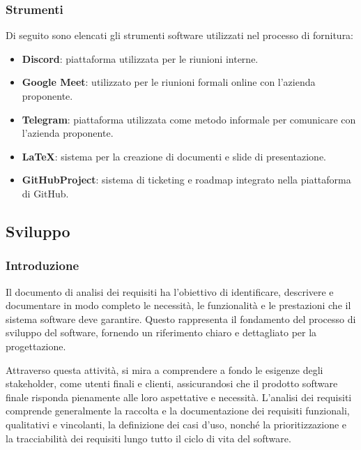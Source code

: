 \subsubsection{Strumenti}
Di seguito sono elencati gli strumenti software utilizzati nel processo di fornitura:
\begin{itemize}
    \item \textbf{Discord}: piattaforma utilizzata per le riunioni interne.
    \item \textbf{Google Meet}: utilizzato per le riunioni formali online con l'azienda proponente.
    \item \textbf{Telegram}: piattaforma utilizzata come metodo informale per comunicare con l'azienda proponente.
    \item \textbf{LaTeX}: sistema per la creazione di documenti e slide di presentazione.
    \item \textbf{GitHubProject}: sistema di ticketing e roadmap integrato nella piattaforma di GitHub. 
\end{itemize}









\subsection{Sviluppo}
\subsubsection{Introduzione}

Il documento di analisi dei requisiti ha l'obiettivo di identificare,
descrivere e documentare in modo completo le necessità, 
le funzionalità e le prestazioni che il sistema software deve garantire. 
Questo rappresenta il fondamento del processo di sviluppo del software, 
fornendo un riferimento chiaro e dettagliato per la progettazione.

Attraverso questa attività, si mira a comprendere a fondo le esigenze degli stakeholder, 
come utenti finali e clienti, assicurandosi che il prodotto software finale risponda 
pienamente alle loro aspettative e necessità. L’analisi dei requisiti comprende 
generalmente la raccolta e la documentazione dei requisiti funzionali, 
qualitativi e vincolanti, la definizione dei casi d’uso, 
nonché la prioritizzazione e la tracciabilità dei requisiti lungo tutto il ciclo
di vita del software.


